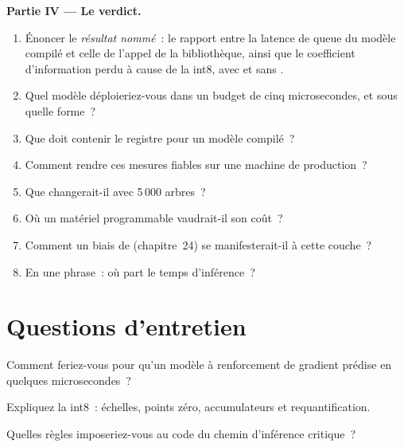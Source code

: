 \begin{problem}
\medskip\noindent\textbf{Partie IV --- Le verdict.}
\begin{enumerate}[resume]
\item Énoncer le \emph{résultat nommé}~: le rapport entre la latence de queue du modèle compilé et celle de l'appel de la bibliothèque, ainsi que le coefficient d'information perdu
à cause de la  int8, avec et sans .
\item Quel modèle déploieriez-vous dans un budget de cinq microsecondes, et sous quelle forme~?
\item Que doit contenir le registre pour un modèle compilé~?
\item Comment rendre ces mesures fiables sur une machine de production~?
\item Que changerait-il avec 5\,000 arbres~?
\item Où un matériel programmable vaudrait-il son coût~?
\item Comment un biais de  (chapitre~24) se manifesterait-il à cette couche~?
\item En une phrase~: où part le temps d'inférence~?
\end{enumerate}
\end{problem}

\section{Questions d'entretien}

\begin{interviewq}\label{iq:ml:low-latency-inference:1}
Comment feriez-vous pour qu'un modèle à renforcement de gradient prédise en quelques microsecondes~?
\end{interviewq}

\begin{interviewq}\label{iq:ml:low-latency-inference:2}
Expliquez la  int8~: échelles, points zéro, accumulateurs et requantification.
\end{interviewq}

\begin{interviewq}\label{iq:ml:low-latency-inference:3}
Quelles règles imposeriez-vous au code du chemin d'inférence critique~?
\end{interviewq}

